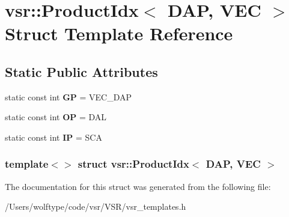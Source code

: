 \hypertarget{structvsr_1_1_product_idx_3_01_d_a_p_00_01_v_e_c_01_4}{\section{vsr\-:\-:Product\-Idx$<$ D\-A\-P, V\-E\-C $>$ Struct Template Reference}
\label{structvsr_1_1_product_idx_3_01_d_a_p_00_01_v_e_c_01_4}
}
\subsection*{Static Public Attributes}
\begin{DoxyCompactItemize}
\item 
\hypertarget{structvsr_1_1_product_idx_3_01_d_a_p_00_01_v_e_c_01_4_a51dbb86289f4786da5372a2000084dd2}{static const int {\bfseries G\-P} = V\-E\-C\-\_\-\-D\-A\-P}\label{structvsr_1_1_product_idx_3_01_d_a_p_00_01_v_e_c_01_4_a51dbb86289f4786da5372a2000084dd2}

\item 
\hypertarget{structvsr_1_1_product_idx_3_01_d_a_p_00_01_v_e_c_01_4_a9dab42c1f369fc6f766e20feb78e929d}{static const int {\bfseries O\-P} = D\-A\-L}\label{structvsr_1_1_product_idx_3_01_d_a_p_00_01_v_e_c_01_4_a9dab42c1f369fc6f766e20feb78e929d}

\item 
\hypertarget{structvsr_1_1_product_idx_3_01_d_a_p_00_01_v_e_c_01_4_a7a50545e45793cda54883c6ca719dadc}{static const int {\bfseries I\-P} = S\-C\-A}\label{structvsr_1_1_product_idx_3_01_d_a_p_00_01_v_e_c_01_4_a7a50545e45793cda54883c6ca719dadc}

\end{DoxyCompactItemize}
\subsubsection*{template$<$$>$ struct vsr\-::\-Product\-Idx$<$ D\-A\-P, V\-E\-C $>$}



The documentation for this struct was generated from the following file\-:\begin{DoxyCompactItemize}
\item 
/\-Users/wolftype/code/vsr/\-V\-S\-R/vsr\-\_\-templates.\-h\end{DoxyCompactItemize}
